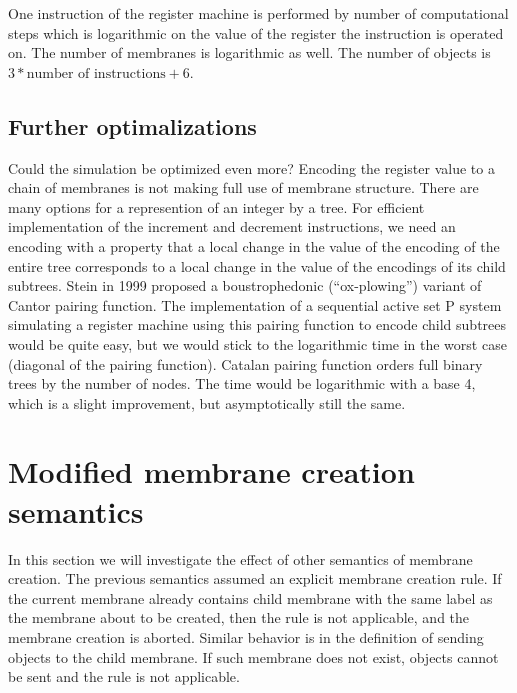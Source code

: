 \documentclass[submission,copyright,creativecommons]{../lib/lncs/llncs}
\begin{document}
One instruction of the register machine is performed by number of computational steps which is logarithmic on the value of the register the instruction is operated on. The number of membranes is logarithmic as well. The number of objects is $3 * \text{number of instructions} + 6$.

\subsection{Further optimalizations} %
\label{sub:further_optimalizations}

Could the simulation be optimized even more? Encoding the register value to a chain of membranes is not making full use of membrane structure. There are many options for a represention of an integer by a tree. For efficient implementation of the increment and decrement instructions, we need an encoding with a property that a local change in the value of the encoding of the entire tree corresponds to a local change in the value of the encodings of its child subtrees. Stein in 1999 \cite{Stein99Plowing} proposed a boustrophedonic (``ox-plowing'') variant of Cantor pairing function. The implementation of a sequential active set P system simulating a register machine using this pairing function to encode child subtrees would be quite easy, but we would stick to the logarithmic time in the worst case (diagonal of the pairing function).
Catalan pairing function \cite{Stanley1986EnumerativeCombinatorics} orders full binary trees by the number of nodes. The time would be logarithmic with a base 4, which is a slight improvement, but asymptotically still the same.




\section{Modified membrane creation semantics} %
\label{sec:modified_membrane_creation_semantics}

In this section we will investigate the effect of other semantics of membrane creation. The previous semantics assumed an explicit membrane creation rule. If the current membrane already contains child membrane with the same label as the membrane about to be created, then the rule is not applicable, and the membrane creation is aborted. Similar behavior is in the definition of sending objects to the child membrane. If such membrane does not exist, objects cannot be sent and the rule is not applicable.
\end{document}
